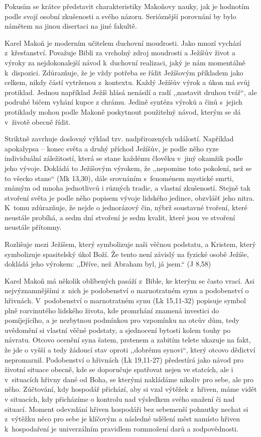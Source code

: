 Pokusím se krátce představit charakteristiky Makoňovy nauky,
jak je hodnotím podle svojí osobní zkušenosti a svého
názoru. Serióznější porovnání by bylo námětem na jinou disertaci na jiné
fakultě.

Karel Makoň je moderním učitelem duchovní moudrosti. Jako mnozí vychází z~křesťanství. Považuje Bibli za vrcholný zdroj
moudrosti a Ježíšův život a výroky za nejdokonalejší návod k~duchovní realizaci,
jaký je nám momentálně k~dispozici. Zdůrazňuje, že je vždy potřeba se řídit
Ježíšovým příkladem jako celkem, nikdy částí vytrženou z~kontextu. Každý Ježíšův
výrok a úkon má svůj protiklad. Jednou například Ježíš hlásá nenásilí a radí
,,nastavit druhou tvář``, ale podruhé bičem vyhání kupce z chrámu. Jedině syntéza výroků a činů s~jejich protiklady
mohou podle Makoně poskytnout použitelný návod, kterým se dá v~životě obecně
řídit.

Striktně zavrhuje doslovný výklad tzv. nadpřirozených událostí. Například
apokalypsa -- konec světa a druhý příchod Ježíšův, je podle něho ryze individuální záležitostí, která se
stane každému člověku v~jiný okamžik podle jeho vývoje. Dokládá to Ježíšovým
výrokem, že ,,nepomine toto pokolení, než se to všecko stane`` (Mk 13,30), dále
srovnáním s~fenoménem mystické smrti, známým od mnoha jednotlivců i různých
tradic, a vlastní zkušeností. Stejně tak stvoření světa je podle něho popisem
vývoje lidského jedince, obzvlášť jeho nitra. K~tomu zdůrazňuje, že nejde o
jednorázový čin, nýbrž soustavné tvoření, které neustále probíhá, a
sedm dní stvoření je sedm kvalit, které jsou ve stvoření neustále přítomny.

Rozlišuje mezi Ježíšem, který symbolizuje naši věčnou podstatu, a Kristem, který
symbolizuje spasitelský úkol Boží. Že tento není závislý na fyzické osobě Ježíše,
dokládá jeho výrokem: ,,Dříve, než Abraham byl, já jsem.`` (J 8,58)

Karel Makoň má několik oblíbených pasáží z~Bible, ke kterým se často vrací. Asi
nejvýznamnějšími z~nich je podobenství o marnotratném synu a podobenství o
hřivnách. V~podobenství o marnotratném synu (Lk 15,11-32) popisuje symbol plně rozvinutého
lidského života, kde promrhání znamená investici do pomíjejícího, a je nezbytnou
podmínkou pro vzpomínku na otcův dům, tedy uvědomění si vlastní věčné podstaty, a
sjednocení bytosti kolem touhy po návratu. Otcovo ocenění syna šatem, prstenem a
zabitím telete ukazuje na fakt, že jde o vyšší a tedy žádoucí stav oproti
,,dobrému synovi``, který otcovo dědictví nepromarnil. Podobenství o hřivnách (Lk 19,11-27)
předestírá jako návod pro životní situace obecně, kde se doporučuje spatřovat
nejen ve statcích, ale i v~situacích hřivny dané od Boha, se kterými nakládáme
nikoliv pro sebe, ale pro něho. Zúčtování, kdy hospodář přichází, aby si vzal
výtěžek z~hřiven, máme vidět v situacích, kdy přicházíme o kontrolu nad
výsledkem svého snažení či nad situací. Moment odevzdání hřiven hospodáři bez
sebemenší pohnutky nechat si z~výtěžku něco pro sebe je klíčovým a následné udělení měst
namísto hřiven k~hospodaření je univerzálním pravidlem rozmnožení darů a
zodpovědnosti.

